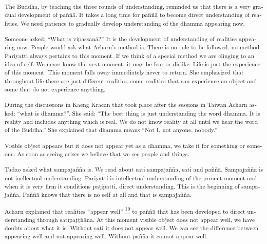 \textsuperscript{\textdutch{T}\textenglish[variant=american]{he
Buddha}\textdutch{, by teaching the three rounds of understanding,
reminded us that there is a very gradual development of paññā. It takes
a long time for paññā to become direct understanding of realities.
}\textenglish[variant=american]{We need patience to gradually develop
understanding of the dhamma appearing now.}}

\textsuperscript{\textdutch{Someone asked: ``What is vipassanā?'' It is
the development of understanding of realities appearing now. People
would ask what Acharn's method is. There is no rule to be followed, no
method. Pariyatti always pertains to this moment. If we think of a
special method we are clinging to an idea of self. We never know the
next moment, it may be fear or dislike. Life is just the experience of
this moment. This moment falls away immediately never to return. She
emphasized that throughout life there are just different realities, some
realities that can experience an object and some that do not experience
anything.}}

\textsuperscript{\textdutch{During the discussions in Kaeng Kracan that
took place after the sessions in Taiwan Acharn asked: ``what is
dhamma?''. She said: ``The best thing is just understanding the word
dhamma. It is reality and includes anything which is real. We do not
know reality at all until we hear the word of the Buddha.'' She
explained that dhamma means ``Not I, not anyone, nobody.'' }}

\textsuperscript{\textdutch{Visible object appears but it does not
appear yet as a dhamma, we take it for something or someone. As soon as
seeing arises we believe that we see people and things. }}

\textsuperscript{\textdutch{Tadao asked what sampajañña is. We read
about sati sampajañña, sati and paññā. Sampajañña is not inellectual
understanding. Pariyatti is intellectual understanding of the present
moment and when it is very firm it conditions paṭipatti, direct
understanding. This is the beginning of sampajañña. Paññā knows that
there is no self at all and that is sampajañña.}}

\textsuperscript{\textdutch{Acharn explained that realities ``appear
well'' \protect\hyperlink{sdfootnote10sym}{\textsuperscript{10}} to
paññā that has been developed to direct understanding through
satipaṭṭhāna. At this moment visible object does not appear well, we
have doubts about what it is. Without sati it does not appear well. We
can see the difference between appearing well and not appearing well.
Without paññā it cannot appear well. }}


